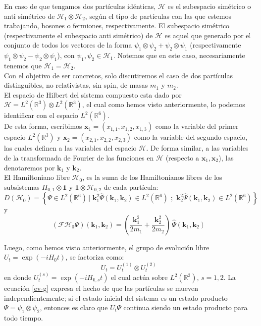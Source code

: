 \documentclass[12pt]{book}
\numberwithin{equation}{chapter}
\def\R{\mathbb{R}}
\def\H{\mathcal{H}}
\def\F{\mathcal{F}}
\def\pr{\otimes}
\def\x{\mathbf{x}}
\def\k{\mathbf{k}}
\def\1{\mathbf{1}}
\begin{document}
En caso de que tengamos dos part\'iculas id\'enticas, $\H$ es el subespacio sim\'etrico o anti sim\'etrico de $ \H_{1} \pr \H_{2} $, seg\'un el tipo de part\'iculas con las que estemos trabajando, bosones o fermiones, respectivamente. El subespacio sim\'etrico (respectivamente el subespacio anti sim\'etrico) de $\H$ es aquel que generado por el conjunto de todos los vectores de la forma $ \psi_{1} \pr \psi_{2} + \psi_{2} \pr \psi_{1} $ (respectivamente $\psi_{1} \pr \psi_{2} - \psi_{2} \pr \psi_{1}$), con $\psi_{1},\psi_{2} \in \H_{1}$. Notemos que en este caso, necesariamente tenemos que $ \H_{1}=\H_{2} $.\\

Con el objetivo de ser concretos, solo discutiremos el caso de dos part\'iculas distinguibles, no relativistas, sin spin, de masas $m_{1}$ y $m_{2}$.\\

El espacio de Hilbert del sistema compuesto esta dado por $\H= L^{2}(\R^{3}) \pr L^{2}(\R^{3}) $, el cual como hemos visto anteriormente, lo podemos identificar con el espacio $L^{2}(\R^{6})$.\\
De esta forma, escribimos $\x_{1}= ( x_{1,1}, x_{1,2},x_{1,3} )$ como la variable del primer espacio $L^{2}(\R^{3})$ y $\x_{2}= ( x_{2,1}, x_{2,2},x_{2,3} )$ como la variable del segundo espacio, las cuales definen a las variables del espacio $\H$. De forma similar, a las variables de la transformada de Fourier de las funciones en $\H$ (respecto a $\x_{1},\x_{2}$), las denotaremos por $\k_{1}$ y $\k_{2}$.\\

El Hamiltoniano libre $\H_{0}$, es la suma de los Hamiltonianos libres de los subsistemas $ H_{0,1} \pr \1 $ y $\1 \pr \H_{0,2}$ de cada part\'icula:
$$ D(\H_{0})= \left\{ \Psi \in L^{2}(\R^{6}) \,\Big|\,\, \k_{1}^{2} \hat{\Psi}(\k_{1},\k_{2}) \in L^{2}(\R^{6}) \,\,;\,\, \k_{2}^{2} \hat{\Psi}(\k_{1},\k_{2}) \in L^{2}(\R^{6})   \right\} $$
y
\begin{equation}
( \F \H_{0} \Psi )( \k_{1},\k_{2} )= \left( \frac{\k_{1}^{2}}{2m_{1}} + \frac{\k_{2}^{2}}{2m_{2}} \right) \, \hat{\Psi}(\k_{1},\k_{2}) 
\end{equation}

Luego, como hemos visto anteriormente, el grupo de evoluci\'on libre $U_{t}= \exp( -i H_{0}t )$, se factoriza como:
\begin{equation}\label{ev-g}
U_{t}= U_{t}^{(1)} \pr U_{t}^{(2)}
\end{equation}
en donde $U_{t}^{(s)} = \exp ( -iH_{0,s}t ) $ el cual act\'ua sobre $L^{2}(\R^{3})$, $s=1,2$. La ecuaci\'on \eqref{ev-g} expresa el hecho de que las part\'iculas se mueven independientemente; si el estado inicial del sistema es un estado producto $\Psi= \psi_{1} \pr \psi_{2}$, entonces es claro que $U_{t} \Psi$ continua siendo un estado producto para todo tiempo.\\
\end{document}
